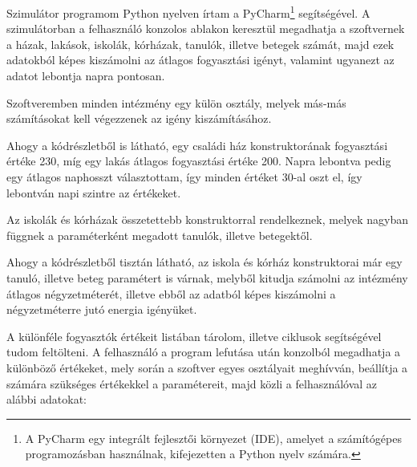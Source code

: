 \documentclass[
]{thesis-ekf}
\theoremstyle{definition}
\theoremstyle{remark}
\begin{document}
			\par Szimulátor programom Python nyelven írtam a PyCharm\footnote{A PyCharm egy integrált fejlesztői környezet (IDE), amelyet a számítógépes programozásban használnak, kifejezetten a Python nyelv számára\cite{pycharm}.} segítségével. A szimulátorban a felhasználó konzolos ablakon keresztül megadhatja a szoftvernek a házak, lakások, iskolák, kórházak, tanulók, illetve betegek számát, majd ezek adatokból képes kiszámolni az átlagos fogyasztási igényt, valamint ugyanezt az adatot lebontja napra pontosan.
			\par Szoftveremben minden intézmény egy külön osztály, melyek más-más számításokat kell végezzenek az igény kiszámításához. 
			
			\par Ahogy a kódrészletből is látható, egy családi ház konstruktorának fogyasztási értéke 230, míg egy lakás átlagos fogyasztási értéke 200. Napra lebontva pedig egy átlagos naphosszt választottam, így minden értéket 30-al oszt el, így lebontván napi szintre az értékeket. 
			\par Az iskolák és kórházak összetettebb konstruktorral rendelkeznek, melyek nagyban függnek a paraméterként megadott tanulók, illetve betegektől.
				
			\par Ahogy a kódrészletből tisztán látható, az iskola és kórház konstruktorai már egy tanuló, illetve beteg paramétert is várnak, melyből kitudja számolni az intézmény átlagos négyzetméterét, illetve ebből az adatból képes kiszámolni a négyzetméterre jutó energia igényüket.
			\par A különféle fogyasztók értékeit listában tárolom, illetve ciklusok segítségével tudom feltölteni. A felhasználó a program lefutása után konzolból megadhatja a különböző értékeket, mely során a szoftver egyes osztályait meghívván, beállítja a számára szükséges értékekkel a paramétereit, majd közli a felhasználóval az alábbi adatokat:
				
			
\end{document}
